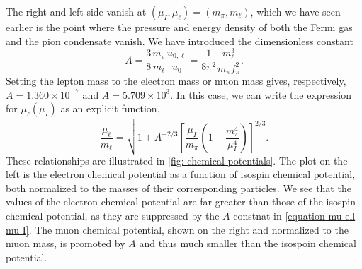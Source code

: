 %
The right and left side vanish at $(\mu_I, \mu_\ell) = (m_\pi, m_\ell)$, which we have seen earlier is the point where the pressure and energy density of both the Fermi gas and the pion condensate vanish.
We have introduced the dimensionless constant
%
\begin{equation}
    A = \frac{3}{8} \frac{m_\pi} {m_\ell} \frac{u_{0, \ell}}{u_0}
    = \frac{1}{8 \pi^2} \frac{m_\ell^3}{m_\pi f_\pi^2}.
\end{equation}
%
Setting the lepton mass to the electron mass or muon mass gives, respectively, $A = 1.360 \times10^{- 7}$ and $A = 5.709 \times 10^{3}$.
In this case, we can write the expression for $\mu_\ell(\mu_I)$ as an explicit function,
%
\begin{equation}
    \label{mu ell from mu I}
    \frac{\mu_\ell}{m_\ell}
    =
    \sqrt{
        1 + A^{-2/3}
        \left[
            \frac{\mu_I}{m_\pi}\left( 1 - \frac{m_\pi^4}{\mu_I^4}  \right)
        \right]^{2/3}
    }.
\end{equation}
%
These relationships are illustrated in \autoref{fig: chemical potentials}.
The plot on the left is the electron chemical potential as a function of isospin chemical potential, both normalized to the masses of their corresponding particles.
We see that the values of the electron chemical potential are far greater than those of the isospin chemical potential, as they are suppressed by the $A$-constnat in \autoref{equation mu ell mu I}.
The muon chemical potential, shown on the right and normalized to the muon mass, is promoted by $A$ and thus much smaller than the isospoin chemical potential.

